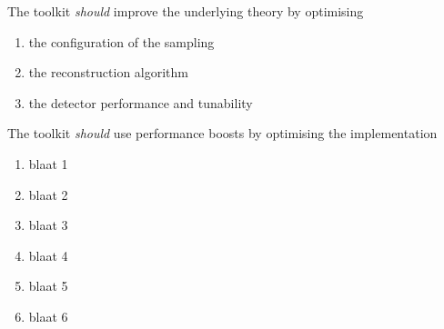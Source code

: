\documentclass[a4paper, openany, oneside]{memoir}
\begin{document}
The toolkit \emph{should} improve the underlying theory by optimising 
\begin{enumerate}
    \item the configuration of the sampling
    \item the reconstruction algorithm
    \item the detector performance and tunability
\end{enumerate}
The toolkit \emph{should} use performance boosts by optimising the implementation 
\begin{enumerate}
    \item blaat 1
    \item blaat 2
    \item blaat 3
    \item blaat 4
    \item blaat 5
    \item blaat 6
\end{enumerate}
\end{document}
